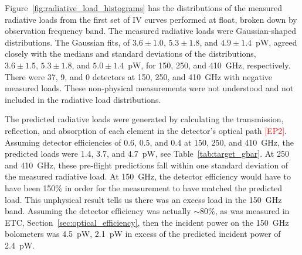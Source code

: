 




Figure~\ref{fig:radiative_load_histograms} has the distributions of the measured radiative loads from the first set of IV curves performed at float, broken down by observation frequency band. 
The measured radiative loads were Gaussian-shaped distributions. 
The Gaussian fits, of $3.6\pm 1.0, \, 5.3\pm 1.8$, and $4.9 \pm 1.4$~pW, agreed closely with the  medians and standard deviations of the distributions, $3.6\pm1.5, \, 5.3\pm1.8$, and $5.0\pm1.4$~pW, 
for 150, 250, and 410~GHz, respectively. 
There were 37, 9, and 0 detectors at 150, 250, and 410~GHz with negative measured loads. 
These non-physical measurements were not understood and not included in the radiative load distributions. 

The predicted radiative loads were generated by calculating the transmission, reflection, and absorption of each element in the detector's optical path \textcolor{red}{[EP2]}.  
Assuming detector efficiencies of 0.6, 0.5, and 0.4 at 150, 250, and 410~GHz, the predicted loads were 1.4, 3.7, and 4.7~pW, see Table~\ref{tab:target_gbar}.
At 250 and 410~GHz, these pre-flight predictions fall within one standard deviation of the measured radiative load. 
At 150~GHz, the detector efficiency would have to have been 150\% in order for the measurement to have matched the predicted load. 
This unphysical result tells us there was an excess load in the 150~GHz band. 
Assuming the detector efficiency was actually $\sim$80\%, as was measured in \ac{ETC}, Section~\ref{sec:optical_efficiency}, then the incident power on the 150~GHz bolometers was 4.5~pW, 2.1~pW in excess of the predicted incident power of 2.4~pW. 

